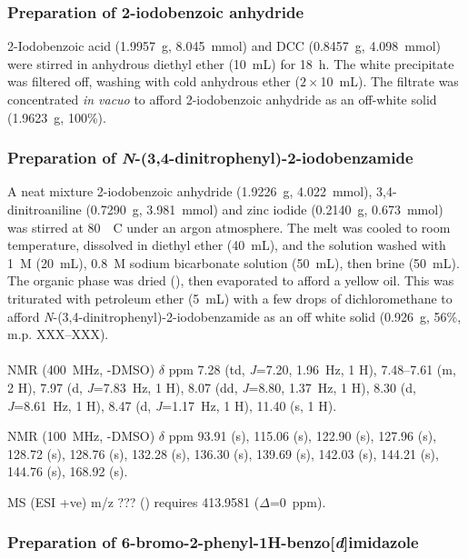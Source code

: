 \begin{refsection}
\normalsize

\subsubsection{Preparation of 2-iodobenzoic anhydride }
2-Iodobenzoic acid (1.9957~g, 8.045~mmol) and DCC (0.8457~g, 4.098~mmol) were stirred in anhydrous diethyl ether (10~mL) for 18~h. The white precipitate was filtered off, washing with cold anhydrous ether ($2\times$10~mL). The filtrate was concentrated \emph{in vacuo} to afford 2-iodobenzoic anhydride  as an off-white solid (1.9623~g, 100\%).

\subsubsection{Preparation of \emph{N}-(3,4-dinitrophenyl)-2-iodobenzamide }
A neat mixture 2-iodobenzoic anhydride  (1.9226~g, 4.022~mmol), 3,4-dinitroaniline (0.7290~g, 3.981~mmol) and zinc iodide (0.2140~g, 0.673~mmol) was stirred at 80~\degree~C under an argon atmosphere.
The melt was cooled to room temperature, dissolved in diethyl ether (40~mL), and the solution washed with 1~\textsc{M}  (20~mL), 0.8~\textsc{M} sodium bicarbonate solution (50~mL), then brine (50~mL).
The organic phase was dried (), then evaporated to afford a yellow oil.
This was triturated with petroleum ether (5~mL) with a few drops of dichloromethane to afford \emph{N}-(3,4-dinitrophenyl)-2-iodobenzamide  as an off white solid (0.926~g, 56\%, m.p. XXX--XXX).\autocite{Shivani2007}

\footnotesize\paragraph{}

 NMR (400~MHz, -DMSO) $\delta$ ppm
7.28 (td, \emph{J}=7.20, 1.96~Hz, 1 H),
7.48--7.61 (m, 2 H),
7.97 (d, \emph{J}=7.83~Hz, 1 H),
8.07 (dd, \emph{J}=8.80, 1.37~Hz, 1 H),
8.30 (d, \emph{J}=8.61~Hz, 1 H),
8.47 (d, \emph{J}=1.17~Hz, 1 H),
11.40 (s, 1 H).

 NMR (100~MHz, -DMSO) $\delta$ ppm
93.91 (s),
115.06 (s),
122.90 (s),
127.96 (s),
128.72 (s),
128.76 (s),
132.28 (s),
136.30 (s),
139.69 (s),
142.03 (s),
144.21 (s),
144.76 (s),
168.92 (s).

MS (ESI +ve) m/z ??? ()  requires 413.9581 ($\Delta$=0~ppm).

\normalsize

\subsubsection{Preparation of 6-bromo-2-phenyl-1\textbf{H}-benzo[\emph{d}]imidazole}

\printbibliography[heading=subbibliography]
\end{refsection}
